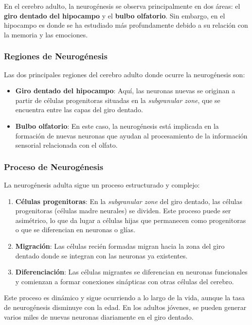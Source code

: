 \documentclass[12pt, letterpaper]{article}
\begin{document}
En el cerebro adulto, la neurogénesis se observa principalmente en dos áreas: el \textbf{giro dentado del hipocampo} y el \textbf{bulbo olfatorio}. Sin embargo, en el hipocampo es donde se ha estudiado más profundamente debido a su relación con la memoria y las emociones.

\subsubsection{Regiones de Neurogénesis}
Las dos principales regiones del cerebro adulto donde ocurre la neurogénesis son:

\begin{itemize}
    \item \textbf{Giro dentado del hipocampo}: Aquí, las neuronas nuevas se originan a partir de células progenitoras situadas en la \textit{subgranular zone}, que se encuentra entre las capas del giro dentado.
    \item \textbf{Bulbo olfatorio}: En este caso, la neurogénesis está implicada en la formación de nuevas neuronas que ayudan al procesamiento de la información sensorial relacionada con el olfato.
\end{itemize}

\subsubsection{Proceso de Neurogénesis}
La neurogénesis adulta sigue un proceso estructurado y complejo:

\begin{enumerate}
    \item \textbf{Células progenitoras}: En la \textit{subgranular zone} del giro dentado, las células progenitoras (células madre neurales) se dividen. Este proceso puede ser asimétrico, lo que da lugar a células hijas que permanecen como progenitoras o que se diferencian en neuronas o glías.
    \item \textbf{Migración}: Las células recién formadas migran hacia la zona del giro dentado donde se integran con las neuronas ya existentes.
    \item \textbf{Diferenciación}: Las células migrantes se diferencian en neuronas funcionales y comienzan a formar conexiones sinápticas con otras células del cerebro.
\end{enumerate}

Este proceso es dinámico y sigue ocurriendo a lo largo de la vida, aunque la tasa de neurogénesis disminuye con la edad. En los adultos jóvenes, se pueden generar varios miles de nuevas neuronas diariamente en el giro dentado.
\end{document}
